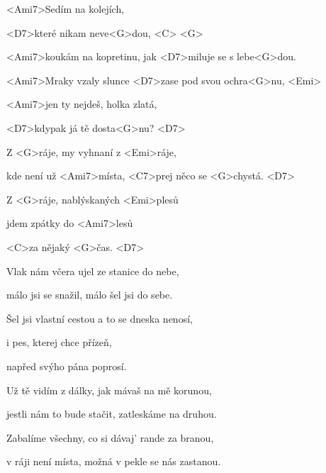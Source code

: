 

\zs
<Ami7>Sedím na kolejích,

<D7>které nikam neve<G>dou, <C> <G>

<Ami7>koukám na kopretinu, jak <D7>miluje se s lebe<G>dou.

<Ami7>Mraky vzaly slunce <D7>zase pod svou ochra<G>nu, <Emi>

<Ami7>jen ty nejdeš, holka zlatá,

<D7>kdypak já tě dosta<G>nu? <D7>
\ks

\zr
Z <G>ráje, my vyhnaní z <Emi>ráje,

kde není už <Ami7>místa, <C7>prej něco se <G>chystá. <D7>

Z <G>ráje, nablýskaných <Emi>plesů

jdem zpátky do <Ami7>lesů

<C>za nějaký <G>čas. <D7>
\kr

\zs
Vlak nám včera ujel ze stanice do nebe,

málo jsi se snažil, málo šel jsi do sebe.

Šel jsi vlastní cestou a to se dneska nenosí,

i pes, kterej chce přízeň,

napřed svýho pána poprosí.
\ks

\zs
Už tě vidím z dálky, jak mávaš na mě korunou,

jestli nám to bude stačit, zatleskáme na druhou.

Zabalíme všechny, co si dávaj' rande za branou,

v ráji není místa, možná v pekle se nás zastanou.
\ks

\kp
